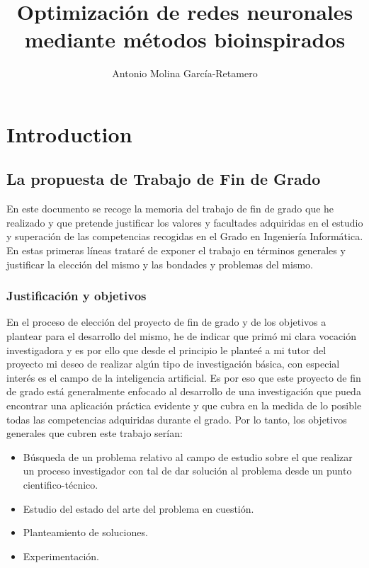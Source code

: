 \documentclass[10pt,a4paper, twocolumn]{report}
\author{Antonio Molina García-Retamero}
\title{Optimización de redes neuronales mediante métodos bioinspirados}
\begin{document}
\onecolumn
\maketitle
\pagebreak
\tableofcontents
\pagebreak

\chapter{Introduction}
\section{La propuesta de Trabajo de Fin de Grado}
En este documento se recoge la memoria del trabajo de fin de grado que he realizado y que pretende justificar los valores y facultades adquiridas en el estudio y superación de las competencias recogidas en el Grado en Ingeniería Informática. En estas primeras líneas trataré de exponer el trabajo en términos generales y justificar la elección del mismo y las bondades y problemas del mismo.

\subsection{Justificación y objetivos}
En el proceso de elección del proyecto de fin de grado y de los objetivos a plantear para el desarrollo del mismo, he de indicar que primó mi clara vocación investigadora y es por ello que desde el principio le planteé a mi tutor del proyecto mi deseo de realizar algún tipo de investigación básica, con especial interés es el campo de la inteligencia artificial. Es por eso que este proyecto de fin de grado está generalmente enfocado al desarrollo de una investigación que pueda encontrar una aplicación práctica evidente y que cubra en la medida de lo posible todas las competencias adquiridas durante el grado. Por lo tanto, los objetivos generales que cubren este trabajo serían:
\begin{itemize}
	\item Búsqueda de un problema relativo al campo de estudio sobre el que realizar un proceso investigador con tal de dar solución al problema desde un punto cientifico-técnico.
	\item Estudio del estado del arte del problema en cuestión.
	\item Planteamiento de soluciones.
	\item Experimentación.
\end{itemize}

\end{document}

